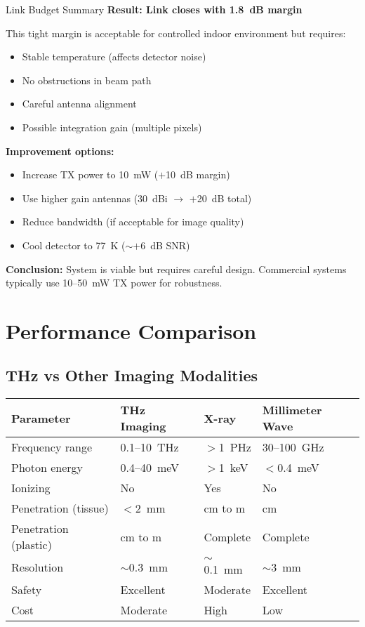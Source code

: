 \begin{calloutbox}[colback=black!8!white,colframe=black]{Link Budget Summary}
\textbf{Result: Link closes with 1.8~dB margin}

This tight margin is acceptable for controlled indoor environment but requires:
\begin{itemize}
\item Stable temperature (affects detector noise)
\item No obstructions in beam path
\item Careful antenna alignment
\item Possible integration gain (multiple pixels)
\end{itemize}

\textbf{Improvement options:}
\begin{itemize}
\item Increase TX power to 10~mW ($+$10~dB margin)
\item Use higher gain antennas (30~dBi $\rightarrow$ $+$20~dB total)
\item Reduce bandwidth (if acceptable for image quality)
\item Cool detector to 77~K ($\sim$$+$6~dB SNR)
\end{itemize}

\textbf{Conclusion:} System is viable but requires careful design. Commercial systems typically use 10--50~mW TX power for robustness.
\end{calloutbox}

\section{Performance Comparison}

\subsection{THz vs Other Imaging Modalities}

\begin{center}
\begin{tabular}{@{}llll@{}}
\toprule
Parameter & THz Imaging & X-ray & Millimeter Wave \\
\midrule
Frequency range & 0.1--10~THz & $>$1~PHz & 30--100~GHz \\
Photon energy & 0.4--40~meV & $>$1~keV & $<$0.4~meV \\
Ionizing & No & Yes & No \\
Penetration (tissue) & $<$2~mm & cm to m & cm \\
Penetration (plastic) & cm to m & Complete & Complete \\
Resolution & $\sim$0.3~mm & $\sim$0.1~mm & $\sim$3~mm \\
Safety & Excellent & Moderate & Excellent \\
Cost & Moderate & High & Low \\
\bottomrule
\end{tabular}
\end{center}


